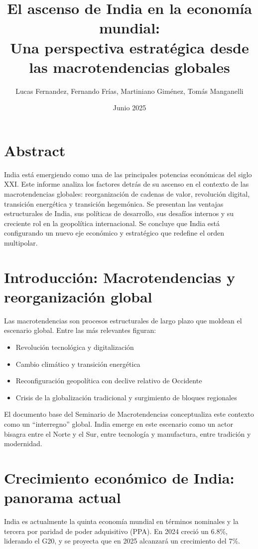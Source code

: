 \documentclass[12pt]{article}
\title{\textbf{El ascenso de India en la economía mundial: \\Una perspectiva estratégica desde las macrotendencias globales}}
\author{Lucas Fernandez, Fernando Frías, Martiniano Giménez, Tomás Manganelli}
\date{Junio 2025}
\begin{document}
\maketitle

\section*{Abstract}

India está emergiendo como una de las principales potencias económicas del siglo XXI. Este informe analiza los factores detrás de su ascenso en el contexto de las macrotendencias globales: reorganización de cadenas de valor, revolución digital, transición energética y transición hegemónica. Se presentan las ventajas estructurales de India, sus políticas de desarrollo, sus desafíos internos y su creciente rol en la geopolítica internacional. Se concluye que India está configurando un nuevo eje económico y estratégico que redefine el orden multipolar.

\section{Introducción: Macrotendencias y reorganización global}

Las macrotendencias son procesos estructurales de largo plazo que moldean el escenario global. Entre las más relevantes figuran:

\begin{itemize}
  \item Revolución tecnológica y digitalización
  \item Cambio climático y transición energética
  \item Reconfiguración geopolítica con declive relativo de Occidente
  \item Crisis de la globalización tradicional y surgimiento de bloques regionales
\end{itemize}

El documento base del Seminario de Macrotendencias conceptualiza este contexto como un “interregno” global. India emerge en este escenario como un actor bisagra entre el Norte y el Sur, entre tecnología y manufactura, entre tradición y modernidad.

\section{Crecimiento económico de India: panorama actual}

India es actualmente la quinta economía mundial en términos nominales y la tercera por paridad de poder adquisitivo (PPA). En 2024 creció un 6.8\%, liderando el G20, y se proyecta que en 2025 alcanzará un crecimiento del 7\%.
\end{document}

